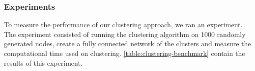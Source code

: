 

\subsubsection{Experiments}\label{sec:clustering:experiments}
To measure the performance of our clustering approach, we ran an experiment. The experiment consisted of running the clustering algorithm on 1000 randomly generated nodes, create a fully connected network of the clusters and measure the computational time used on clustering. \autoref{table:clustering-benchmark} contain the results of this experiment.


